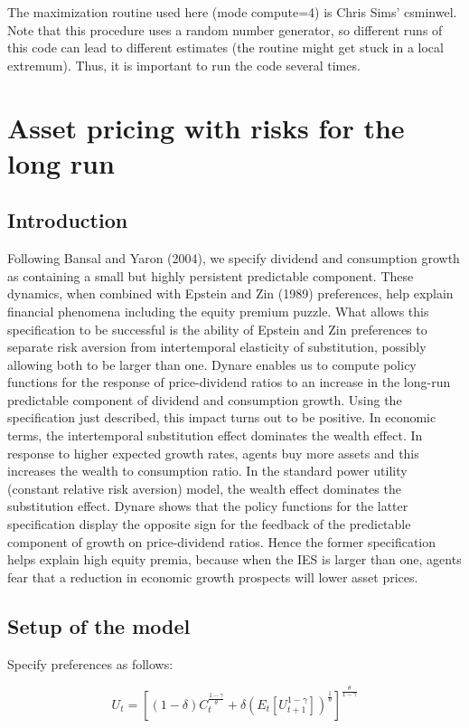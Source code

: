 \documentclass[a4paper,12pt]{scrartcl} %
\begin{document}
The maximization routine used here (mode compute=4) is Chris Sims’ csminwel. Note that this procedure uses a random number generator, so different runs of this code can lead to different estimates (the routine might get stuck in a local extremum). Thus, it is important to run the code several times.

\section{Asset pricing with risks for the long run}
\subsection{Introduction}

Following Bansal and Yaron (2004), we specify dividend and consumption growth as containing a small but highly persistent predictable component. These dynamics, when combined with Epstein and Zin (1989) preferences, help explain financial phenomena including the equity premium puzzle. What allows this specification to be successful is the ability of Epstein and Zin preferences to separate risk aversion from intertemporal elasticity of substitution, possibly allowing both to be larger than one. Dynare enables us to compute policy functions for the response of price-dividend ratios to an increase in the long-run predictable component of dividend and consumption growth. Using the specification just described, this impact turns out to be positive. In economic terms, the intertemporal substitution effect dominates the wealth effect. In response to higher expected growth rates, agents buy more assets and this increases the wealth to consumption ratio. In the standard power utility (constant relative risk aversion) model, the wealth effect dominates the substitution effect. Dynare shows that the policy functions for the latter specification display the opposite sign for the feedback of the predictable component of growth on price-dividend ratios. Hence the former specification helps explain high equity premia, because when the IES is larger than one, agents fear that a reduction in economic growth prospects will lower asset prices.

\subsection{Setup of the model}

Specify preferences as follows:

\begin{equation}\label{49}
U_t=\left[(1-\delta)C_t^{\frac{1-\gamma}{\theta}}+\delta \left(E_t\left[U_{t+1}^{1-\gamma}\right]\right)^{\frac{1}{\theta}}\right]^{\frac{\theta}{1-\gamma}}
\end{equation}
\end{document}
